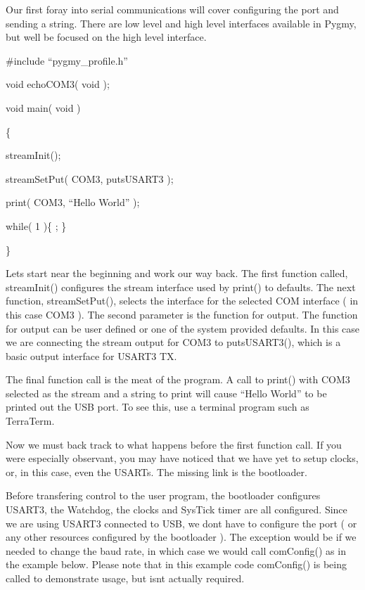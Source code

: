 \documentclass{article}
\begin{document}
Our first foray into serial communications will cover configuring the port and sending a string. There are low level and high level interfaces available in Pygmy, but we{\textquotesingle}ll be focused on the high level interface.


\bigskip

\#include {\textquotedblleft}pygmy\_profile.h{\textquotedblright}


\bigskip

void echoCOM3( void );


\bigskip

void main( void )

\{

streamInit();

streamSetPut( COM3, putsUSART3 );

print( COM3, {\textquotedblleft}Hello World{\textquotedblright} );


\bigskip

while( 1 )\{ ; \}

\}


\bigskip

Let{\textquotesingle}s start near the beginning and work our way back. The first function called, streamInit() configures the stream interface used by print() to defaults. The next function, streamSetPut(), selects the interface for the selected COM interface ( in this case COM3 ). The second parameter is the function for output. The function for output can be user defined or one of the system provided defaults. In this case we are connecting the stream output for COM3 to putsUSART3(), which is a basic output interface for USART3 TX.

The final function call is the meat of the program. A call to print() with COM3 selected as the stream and a string to print will cause {\textquotedblleft}Hello World{\textquotedblright} to be printed out the USB port. To see this, use a terminal program such as TerraTerm.

Now we must back track to what happens before the first function call. If you were especially observant, you may have noticed that we have yet to setup clocks, or, in this case, even the USARTs. The missing link is the bootloader.

Before transfering control to the user program, the bootloader configures USART3, the Watchdog, the clocks and SysTick timer are all configured. Since we are using USART3 connected to USB, we don{\textquotesingle}t have to configure the port ( or any other resources configured by the bootloader ). The exception would be if we needed to change the baud rate, in which case we would call comConfig() as in the example below. Please note that in this example code comConfig() is being called to demonstrate usage, but isn{\textquotesingle}t actually required.
\end{document}
